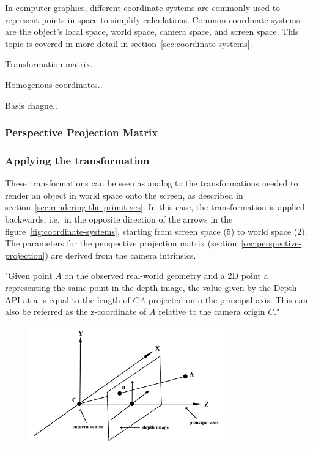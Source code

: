 In computer graphics, different coordinate systems are commonly used to represent points in space to simplify calculations.
Common coordinate systems are the object's local space, world space, camera space, and screen space.
This topic is covered in more detail in section~\ref{sec:coordinate-systems}.

Transformation matrix..

Homogenous coordinates..

Basis chagne..

\parencite{dorner_virtual_2019}

\subsubsection{Perspective Projection Matrix}

\subsubsection{Applying the transformation}
These transformations can be seen as analog to the transformations needed to
render an object in world space onto the screen, as described in section~\ref{sec:rendering-the-primitives}.
In this case, the transformation is applied backwards, i.e.\ in the opposite direction of the arrows
in the figure~\ref{fig:coordinate-systems}, starting from screen space (5) to world space (2).
The parameters for the perspective projection matrix (section~\ref{sec:perspective-projection}) are derived from the camera intrinsics.


"Given point $A$ on the observed real-world geometry and a 2D point a representing the same point in the depth image,
the value given by the Depth API at a is equal to the length of $CA$ projected onto the principal axis.
This can also be referred as the z-coordinate of $A$ relative to the camera origin $C$." \parencite{google_llc_arcore_doc}
\begin{figure}[h]
    \centering
    \includegraphics[width=0.75\textwidth]{images/depth-values-diagram}
    \caption{}
    \label{fig:}
\end{figure}

